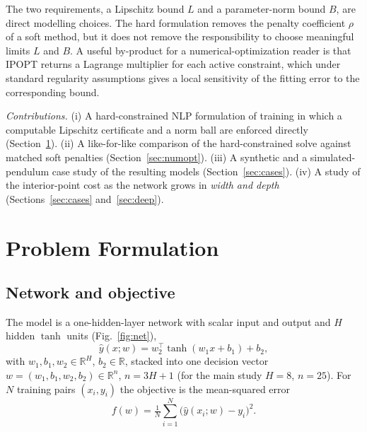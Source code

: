 \documentclass[conference]{IEEEtran}
\newcommand{\wvec}{w}
\newcommand{\Lmax}{L}
\newcommand{\Bmax}{B}
\newcommand{\yhat}{\hat{y}}
\begin{document}
The two requirements, a Lipschitz bound $\Lmax$ and a parameter-norm bound $\Bmax$,
are direct modelling choices. The hard formulation removes the penalty coefficient
$\rho$ of a soft method, but it does not remove the responsibility to choose
meaningful limits $\Lmax$ and $\Bmax$. A useful by-product for a
numerical-optimization reader is that IPOPT returns a Lagrange multiplier for each
active constraint, which under standard regularity assumptions gives a local
sensitivity of the fitting error to the corresponding bound.

\emph{Contributions.} (i) A hard-constrained NLP formulation of training in which a
computable Lipschitz certificate and a norm ball are enforced directly
(Section~\ref{sec:form}). (ii) A like-for-like comparison of the hard-constrained
solve against matched soft penalties (Section~\ref{sec:numopt}). (iii) A synthetic
and a simulated-pendulum case study of the resulting models
(Section~\ref{sec:cases}). (iv) A study of the interior-point cost as the network
grows in \emph{width and depth} (Sections~\ref{sec:cases} and~\ref{sec:deep}).

\section{Problem Formulation}\label{sec:form}
\subsection{Network and objective}
The model is a one-hidden-layer network with scalar input and output and $H$
hidden $\tanh$ units (Fig.~\ref{fig:net}),
\begin{equation}
\yhat(x;\wvec)=\wvec_2^\top\tanh(\wvec_1 x+b_1)+b_2,
\label{eq:net}
\end{equation}
with $\wvec_1,b_1,\wvec_2\in\mathbb{R}^{H}$, $b_2\in\mathbb{R}$, stacked into one
decision vector $\wvec=(\wvec_1,b_1,\wvec_2,b_2)\in\mathbb{R}^{n}$, $n=3H+1$
(for the main study $H=8$, $n=25$). For $N$ training pairs $(x_i,y_i)$ the
objective is the mean-squared error
\begin{equation}
f(\wvec)=\tfrac1N\textstyle\sum_{i=1}^N\bigl(\yhat(x_i;\wvec)-y_i\bigr)^2.
\label{eq:mse}
\end{equation}
\end{document}

